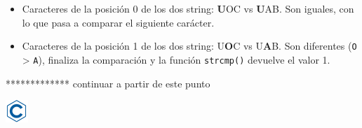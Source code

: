 \documentclass[
]{book}
\providecommand{\tightlist}{%
  \setlength{\itemsep}{0pt}\setlength{\parskip}{0pt}}
\begin{document}
\begin{itemize}
\tightlist
\item
  Caracteres de la posición 0 de los dos string: \textbf{U}OC vs \textbf{U}AB. Son iguales, con lo que pasa a comparar el siguiente carácter.
\item
  Caracteres de la posición 1 de los dos string: U\textbf{O}C vs U\textbf{A}B. Son diferentes (\texttt{\textquotesingle{}O\textquotesingle{}} \textgreater{} \texttt{\textquotesingle{}A\textquotesingle{}}), finaliza la comparación y la función \texttt{strcmp()} devuelve el valor 1.
\end{itemize}

************* continuar a partir de este punto

\includegraphics{./img/c.png}
\end{document}
